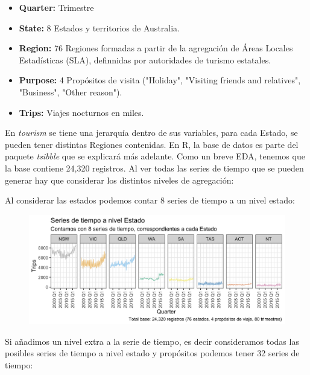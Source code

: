 \begin{itemize}
    \item \textbf{Quarter:} Trimestre
    \item \textbf{State:} 8 Estados y territorios de Australia.
    \item \textbf{Region:} 76 Regiones formadas a partir de la agregación de Áreas Locales Estadísticas (SLA), definnidas por autoridades de turismo estatales.
    \item \textbf{Purpose:} 4 Propósitos de visita ("Holiday", "Visiting friends and relatives", "Business", "Other reason").
    \item \textbf{Trips:} Viajes nocturnos en miles.
\end{itemize}

En \textit{tourism} se tiene una jerarquía dentro de sus variables, para cada Estado, se pueden tener distintas Regiones contenidas. En R, la base de datos es parte del paquete \textit{tsibble} que se explicará más adelante. Como un breve EDA, tenemos que la base contiene 24,320 registros.  Al ver todas las series de tiempo que se pueden generar hay que considerar los distintos niveles de agregación:

\newpage

Al considerar las estados podemos contar 8 series de tiempo a un nivel estado:

    \begin{figure}[!h]
    \centering
      \includegraphics[width=120mm]{imgs/01_ts_state.png}
      \label{fig:snowyplot}
    \end{figure}
    
Si añadimos un nivel extra a la serie de tiempo, es decir consideramos todas las posibles series de tiempo a nivel estado y propósitos podemos tener 32 series de tiempo:

